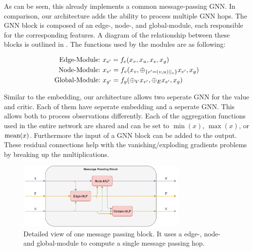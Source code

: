 As can be seen, this already implements a common message-passing GNN. In comparison, our architecture adds the ability to process multiple GNN hops.
The GNN block is composed of an edge-, node-, and global-module, each responsible for the corresponding features. A diagram of the relationship between these blocks is outlined in . The functions used by the modules are as following:

\begin{equation}
    \begin{aligned}
        \textup{Edge-Module:}\ & x_{e'} = f_e(x_v, x_u, x_e, x_g)\\
        \textup{Node-Module:}\ & x_{v'} = f_v(x_v, \oplus_{\{e'=(v,u)||_v\}} x_{e'}, x_g)\\
        \textup{Global-Module:}\ & x_{g'} = f_g(\oplus_V x_{v'}, \oplus_E x_{e'}, x_g)
    \end{aligned}
    \nonumber
\end{equation}

Similar to the embedding, our architecture allows two seperate GNN for the value and critic. Each of them have seperate embedding and a seperate GNN. This allows both to process observations differently. Each of the aggregation functions used in the entire network are shared and can be set to $\min(x)$, $\max(x)$, or $\textup{mean}(x)$. Furthermore the input of a GNN block can be added to the output. These residual connections help with the vanishing/exploding gradients problems by breaking up the multiplications.

\begin{figure}[htp]
    \centering
    \includegraphics[width=0.75\textwidth]{figures/message_passing_block.png}
    \hspace{1cm}   
    \caption{Detailed view of one message passing block. It uses a edge-, node- and global-module to compute a single message passing hop.}
    \label{fig:message_passing_block}
\end{figure}



